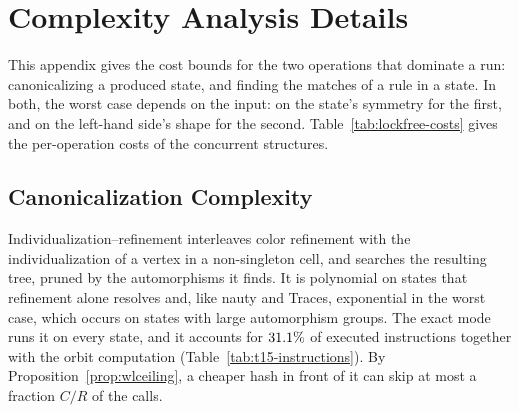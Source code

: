 \documentclass[9pt,twocolumn,a4paper]{extarticle}
\begin{document}

























\appendix

\section{Complexity Analysis Details}
\label{app:complexity}

This appendix gives the cost bounds for the two operations that dominate a run: canonicalizing
a produced state, and finding the matches of a rule in a state. In both, the worst case depends
on the input: on the state's symmetry for the first, and on the left-hand side's shape for the
second. Table~\ref{tab:lockfree-costs} gives the per-operation costs of the concurrent structures.

\subsection{Canonicalization Complexity}

Individualization--refinement interleaves color refinement with the individualization of a vertex
in a non-singleton cell, and searches the resulting tree, pruned by the automorphisms it finds. It
is polynomial on states that refinement alone resolves and, like nauty and Traces, exponential in
the worst case, which occurs on states with large automorphism groups. The exact mode runs it on
every state, and it accounts for $31.1\%$ of executed instructions together with the
orbit computation (Table~\ref{tab:t15-instructions}). By Proposition~\ref{prop:wlceiling}, a
cheaper hash in front of it can skip at most a fraction $C/R$ of the calls.
\end{document}
